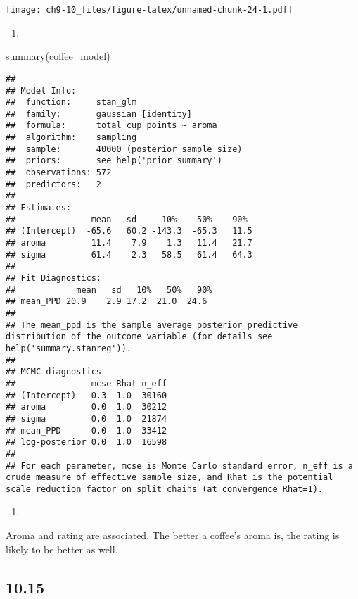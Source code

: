 \documentclass[
]{article}
\newenvironment{Shaded}{\begin{snugshade}}{\end{snugshade}}
\newcommand{\FunctionTok}[1]{\textcolor[rgb]{0.00,0.00,0.00}{#1}}
\newcommand{\NormalTok}[1]{#1}
\providecommand{\tightlist}{%
  \setlength{\itemsep}{0pt}\setlength{\parskip}{0pt}}
\begin{document}
\texttt{[image: ch9-10\_files/figure-latex/unnamed-chunk-24-1.pdf]}

\begin{enumerate}
\def\labelenumi{\alph{enumi}.}
\setcounter{enumi}{3}
\tightlist
\item
\end{enumerate}

\begin{Shaded}
\begin{Highlighting}[]
\FunctionTok{summary}\NormalTok{(coffee\_model)}
\end{Highlighting}
\end{Shaded}

\begin{verbatim}
## 
## Model Info:
##  function:     stan_glm
##  family:       gaussian [identity]
##  formula:      total_cup_points ~ aroma
##  algorithm:    sampling
##  sample:       40000 (posterior sample size)
##  priors:       see help('prior_summary')
##  observations: 572
##  predictors:   2
## 
## Estimates:
##               mean   sd     10%    50%    90% 
## (Intercept)  -65.6   60.2 -143.3  -65.3   11.5
## aroma         11.4    7.9    1.3   11.4   21.7
## sigma         61.4    2.3   58.5   61.4   64.3
## 
## Fit Diagnostics:
##            mean   sd   10%   50%   90%
## mean_PPD 20.9    2.9 17.2  21.0  24.6 
## 
## The mean_ppd is the sample average posterior predictive distribution of the outcome variable (for details see help('summary.stanreg')).
## 
## MCMC diagnostics
##               mcse Rhat n_eff
## (Intercept)   0.3  1.0  30160
## aroma         0.0  1.0  30212
## sigma         0.0  1.0  21874
## mean_PPD      0.0  1.0  33412
## log-posterior 0.0  1.0  16598
## 
## For each parameter, mcse is Monte Carlo standard error, n_eff is a crude measure of effective sample size, and Rhat is the potential scale reduction factor on split chains (at convergence Rhat=1).
\end{verbatim}

\begin{enumerate}
\def\labelenumi{\alph{enumi}.}
\setcounter{enumi}{4}
\tightlist
\item
\end{enumerate}

Aroma and rating are associated. The better a coffee's aroma is, the
rating is likely to be better as well.

\hypertarget{section-10}{%
\subsection{10.15}\label{section-10}}
\end{document}
